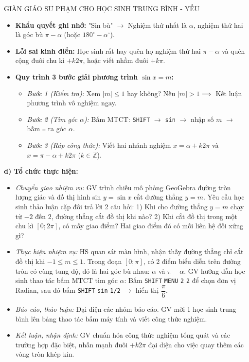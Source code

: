 \documentclass[12pt, a4paper]{article}
\begin{document}
\begin{scaffoldbox}{GIÀN GIÁO SƯ PHẠM CHO HỌC SINH TRUNG BÌNH - YẾU}  
\begin{itemize}[leftmargin=0.6cm]  
    \item \textbf{Khẩu quyết ghi nhớ:} "Sin bù" $\to$ Nghiệm thứ nhất là $\alpha$, nghiệm thứ hai là góc bù $\pi - \alpha$ (hoặc $180^\circ - \alpha^\circ$).  
    \item \textbf{Lỗi sai kinh điển:} Học sinh rất hay quên họ nghiệm thứ hai $\pi - \alpha$ và quên cộng đuôi chu kì $+ k2\pi$, hoặc viết nhầm đuôi $+ k\pi$.  
    \item \textbf{Quy trình 3 bước giải phương trình $\sin x = m$:}  
    \begin{itemize}  
        \item \textit{Bước 1 (Kiểm tra):} Xem $|m| \le 1$ hay không? Nếu $|m| > 1 \implies$ Kết luận phương trình vô nghiệm ngay.  
        \item \textit{Bước 2 (Tìm góc $\alpha$):} Bấm MTCT: \texttt{SHIFT} $\to$ \texttt{sin} $\to$ nhập số $m$ $\to$ bấm \texttt{=} ra góc $\alpha$.  
        \item \textit{Bước 3 (Ráp công thức):} Viết hai nhánh nghiệm $x = \alpha + k2\pi$ và $x = \pi - \alpha + k2\pi$ ($k \in \mathbb{Z}$).  
    \end{itemize}  
\end{itemize}  
\end{scaffoldbox}  
  
\noindent \textbf{d) Tổ chức thực hiện:}  
\begin{itemize}[leftmargin=0.8cm]  
    \item \textit{Chuyển giao nhiệm vụ:}  
    GV trình chiếu mô phỏng GeoGebra đường tròn lượng giác và đồ thị hình sin $y = \sin x$ cắt đường thẳng $y = m$. Yêu cầu học sinh thảo luận cặp đôi trả lời 2 câu hỏi:  
    1) Khi cho đường thẳng $y = m$ chạy từ $-2$ đến $2$, đường thẳng cắt đồ thị khi nào?  
    2) Khi cắt đồ thị trong một chu kì $[0; 2\pi]$, có mấy giao điểm? Hai giao điểm đó có mối liên hệ đối xứng gì?  
    \item \textit{Thực hiện nhiệm vụ:}  
    HS quan sát màn hình, nhận thấy đường thẳng chỉ cắt đồ thị khi $-1 \le m \le 1$. Trong đoạn $[0; \pi]$, có 2 điểm biểu diễn trên đường tròn có cùng tung độ, đó là hai góc bù nhau: $\alpha$ và $\pi - \alpha$.  
    GV hướng dẫn học sinh thao tác bấm MTCT tìm góc $\alpha$: Bấm \texttt{SHIFT} \texttt{MENU} \texttt{2} \texttt{2} để chọn đơn vị Radian, sau đó bấm \texttt{SHIFT} \texttt{sin} \texttt{1/2} $\to$ hiển thị $\dfrac{\pi}{6}$.  
    \item \textit{Báo cáo, thảo luận:} Đại diện các nhóm báo cáo. GV mời 1 học sinh trung bình lên bảng thao tác bấm máy tính và viết công thức nghiệm.  
    \item \textit{Kết luận, nhận định:} GV chuẩn hóa công thức nghiệm tổng quát và các trường hợp đặc biệt, nhấn mạnh đuôi $+ k2\pi$ đại diện cho việc quay thêm các vòng tròn khép kín.  
\end{itemize}  
  
\end{document}
